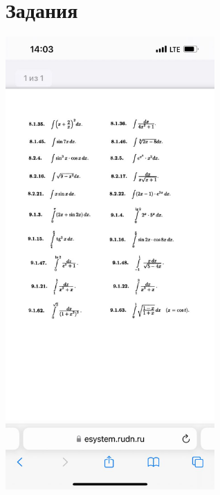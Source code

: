 \documentclass[a4paper]{article}
\begin{document}
\pagestyle{empty}

\section{Задания}

\begin{multicols}{2}

\includegraphics[width=8cm]{photo_1.jpg}


\end{multicols}
\end{document}
